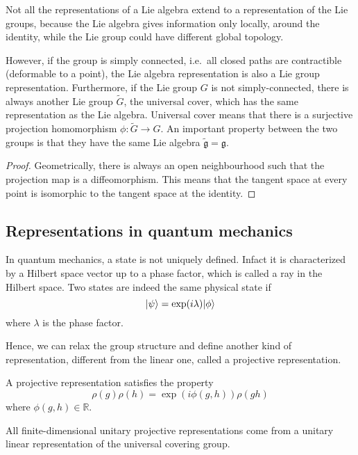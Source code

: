     Not all the representations of a Lie algebra extend to a representation of the Lie groups, because the Lie algebra gives information only locally, around the identity, while the Lie group could have different global topology. 

    However, if the group is simply connected, i.e.~all closed paths are contractible (deformable to a point), the Lie algebra representation is also a Lie group representation. Furthermore, if the Lie group $G$ is not simply-connected, there is always another Lie group $\tilde G$, the universal cover, which has the same representation as the Lie algebra. Universal cover means that there is a surjective projection homomorphism $\phi \colon \tilde G \rightarrow G$. An important property between the two groups is that they have the same Lie algebra $\tilde{\mathfrak g} = \mathfrak g$. 

    \begin{proof}
        Geometrically, there is always an open neighbourhood such that the projection map is a diffeomorphism. This means that the tangent space at every point is isomorphic to the tangent space at the identity.
    \end{proof}

\subsection{Representations in quantum mechanics}

    In quantum mechanics, a state is not uniquely defined. Infact it is characterized by a Hilbert space vector up to a phase factor, which is called a ray in the Hilbert space. Two states are indeed the same physical state if 
    \begin{equation*}
        \vert\psi\rangle = \exp(i \lambda) \vert\phi\rangle
    \end{equation*}
    where $\lambda$ is the phase factor.

    Hence, we can relax the group structure and define another kind of representation, different from the linear one, called a projective representation. 
    \begin{definition}
        A projective representation satisfies the property
        \begin{equation*}
            \rho(g) \rho(h) = \exp(i \phi(g, h)) \rho(gh)
        \end{equation*}
        where $\phi(g, h) \in \mathbb R$. 
    \end{definition}

    All finite-dimensional unitary projective representations come from a unitary linear representation of the universal covering group. 
